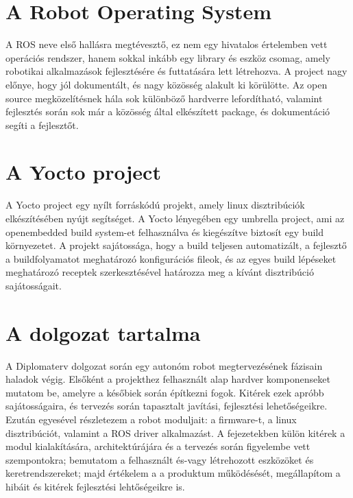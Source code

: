 \section{A Robot Operating System}

A ROS neve első hallásra megtévesztő, ez nem egy hivatalos értelemben vett
operációs rendszer, hanem sokkal inkább egy library és eszköz csomag, amely
robotikai alkalmazások fejlesztésére és futtatására lett létrehozva. A project
nagy előnye, hogy jól dokumentált, és nagy közösség alakult ki körülötte. 
Az open source megközelítésnek hála sok különböző hardverre lefordítható,
valamint fejlesztés során sok már a közösség által elkészített package, és
dokumentáció segíti a fejlesztőt.

\section{A Yocto project}

A Yocto project egy nyílt forráskódú projekt, amely linux disztribúciók
elkészítésében nyújt segítséget. A Yocto lényegében egy umbrella project, ami az
openembedded build system-et felhasználva és kiegészítve biztosít egy build
környezetet. A projekt sajátossága, hogy a build teljesen automatizált, a
fejlesztő a buildfolyamatot meghatározó konfigurációs fileok, és az egyes
build lépéseket meghatározó receptek szerkesztésével határozza meg a kívánt
disztribúció sajátosságait.

\section{A dolgozat tartalma}

A Diplomaterv dolgozat során egy autonóm robot megtervezésének fázisain haladok
végig. Elsőként a projekthez felhasznált alap hardver komponenseket mutatom be,
amelyre a későbiek során építkezni fogok. Kitérek ezek apróbb sajátosságaira, és
tervezés során tapasztalt javítási, fejlesztési lehetőségeikre. Ezután egyesével
részletezem a robot moduljait: a firmware-t, a linux disztribúciót, valamint a
ROS driver alkalmazást. A fejezetekben külön kitérek a modul kialakítására,
architektúrájára és a tervezés során figyelembe vett szempontokra; bemutatom a
felhasznált és-vagy létrehozott eszközöket és keretrendszereket; majd értékelem a
a produktum működésését, megállapítom a hibáit és kitérek fejlesztési
lehtőségeikre is.


